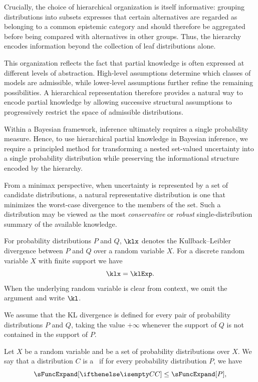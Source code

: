 Crucially, the choice of hierarchical organization is itself informative: grouping distributions into subsets
expresses that certain alternatives are regarded as belonging to a common epistemic category and should therefore be
aggregated before being compared with alternatives in other groups.
Thus, the hierarchy encodes information beyond the collection of leaf distributions alone.

This organization reflects the fact that partial knowledge is often expressed at different levels of abstraction.
High-level assumptions determine which classes of models are admissible, while lower-level assumptions further
refine the remaining possibilities.
A hierarchical representation therefore provides a natural way to encode partial knowledge by allowing successive
structural assumptions to progressively restrict the space of admissible distributions.

Within a Bayesian framework, inference ultimately requires a single probability measure.
Hence, to use hierarchical partial knowledge in Bayesian inference, we require a principled method for
transforming a nested set-valued uncertainty into a single probability distribution while preserving
the informational structure encoded by the hierarchy.

From a minimax perspective, when uncertainty is represented by a set of candidate distributions, a natural
representative distribution is one that minimizes the worst-case divergence to the members of the set.
Such a distribution may be viewed as the most \emph{conservative} or \emph{robust} single-distribution summary of the
available knowledge.

\begin{notation}
    For probability distributions $P$ and $Q$, $\klx$
    denotes the Kullback--Leibler divergence between $P$ and $Q$ over a random variable $X$.
    For a discrete random variable $X$ with finite support we have
    \[
        \klx = \klExp.
    \]
    When the underlying random variable is clear from context, we omit the argument and write $\kl$.

    We assume that the KL divergence is defined for every pair of probability distributions $P$ and $Q$,
    taking the value $+\infty$ whenever the support of $Q$ is not contained in the support of $P$.
\end{notation}


\begin{definition}\label{def:center-of-set}
    Let $X$ be a random variable and \setQ be a set of probability distributions over $X$.
    We say that a distribution $C$ is a \emph{\cd}\ if for every probability
    distribution $P$, we have
    \begin{equation*}
        \sFuncExpand[\cDist] \leq \sFuncExpand[P],
    \end{equation*}
\end{definition}

